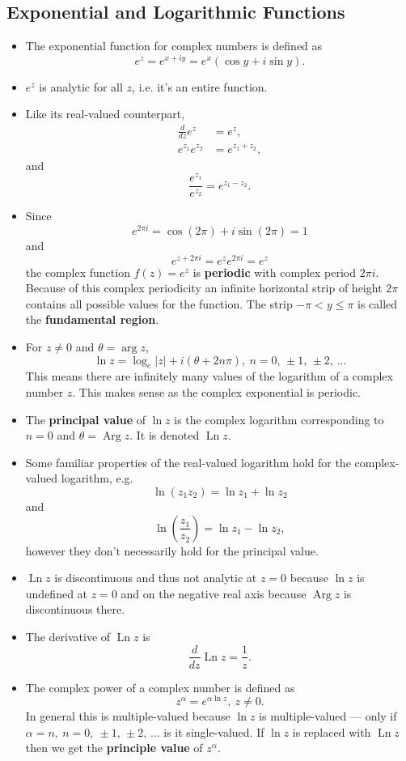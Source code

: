 \documentclass{article}
\newcommand{\Arg}{\operatorname{Arg}}
\newcommand{\Ln}{\operatorname{Ln}}
\begin{document}
\subsection{Exponential and Logarithmic Functions}

\begin{itemize}
  \item The exponential function for complex numbers is defined as \[e^z = e^{x + i y} = e^x (\cos y + i \sin y).\]

  \item $e^z$ is analytic for all $z$, i.e. it's an entire function.

  \item Like its real-valued counterpart, \begin{align*}
          \frac{d}{d z} e^z & = e^z,           \\
          e^{z_1} e^{z_2}   & = e^{z_1 + z_2},
        \end{align*} and \[\frac{e^{z_1}}{e^{z_2}} = e^{z_1 - z_2}.\]

  \item Since \[e^{2 \pi i} = \cos (2 \pi) + i \sin (2 \pi) = 1\] and \[e^{z + 2 \pi i} = e^z e^{2 \pi i} = e^z\] the complex function $f(z) = e^z$ is \textbf{periodic} with complex period $2 \pi i$. Because of this complex periodicity an infinite horizontal strip of height $2 \pi$ contains all possible values for the function. The strip $-\pi < y \le \pi$ is called the \textbf{fundamental region}.

  \item For $z \ne 0$ and $\theta = \arg z$, \[\ln z = \log_e |z| + i (\theta + 2 n \pi),\ n = 0, \,\pm 1, \,\pm 2, \,\ldots\] This means there are infinitely many values of the logarithm of a complex number $z$. This makes sense as the complex exponential is periodic.

  \item The \textbf{principal value} of $\ln z$ is the complex logarithm corresponding to $n = 0$ and $\theta = \Arg z$. It is denoted $\Ln z$.

  \item Some familiar properties of the real-valued logarithm hold for the complex-valued logarithm, e.g. \[\ln (z_1 z_2) = \ln z_1 + \ln z_2\] and \[\ln \left( \frac{z_1}{z_2} \right) = \ln z_1 - \ln z_2,\] however they don't necessarily hold for the principal value.

  \item $\Ln z$ is discontinuous and thus not analytic at $z = 0$ because $\ln z$ is undefined at $z = 0$ and on the negative real axis because $\Arg z$ is discontinuous there.

  \item The derivative of $\Ln z$ is \[\frac{d}{d z} \Ln z = \frac{1}{z}.\]

  \item The complex power of a complex number is defined as \[z^\alpha = e^{\alpha \ln z}, \ z \ne 0.\] In general this is multiple-valued because $\ln z$ is multiple-valued — only if $\alpha = n,\ n = 0, \ \pm 1, \,\pm 2, \,\ldots$ is it single-valued. If $\ln z$ is replaced with $\Ln z$ then we get the \textbf{principle value} of $z^\alpha$.
\end{itemize}
\end{document}
